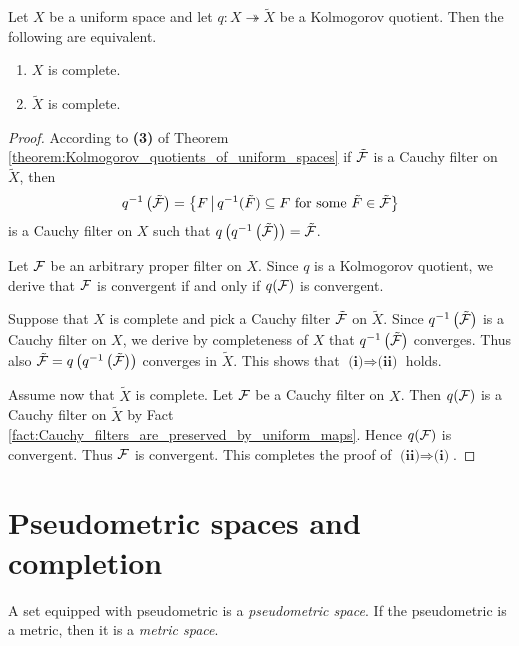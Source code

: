 \begin{theorem}\label{theorem:completeness_is_preserved_and_reflected_by_Kolmogorov_quotients}
	Let $X$ be a uniform space and let $q:X\twoheadrightarrow \tilde{X}$ be a Kolmogorov quotient. Then the following are equivalent.
	\begin{enumerate}[label=\emph{\textbf{(\roman*)}}, leftmargin=3.0em]
		\item $X$ is complete.
		\item $\tilde{X}$ is complete. 
	\end{enumerate}
\end{theorem}
\begin{proof}
	According to \textbf{(3)} of Theorem \ref{theorem:Kolmogorov_quotients_of_uniform_spaces} if $\tilde{{\mathcal F}}$ is a Cauchy filter on $\tilde{X}$, then 
	$$q^{-1}\left(\tilde{{\mathcal F}}\right) = \big\{F\,\big|\,q^{-1}(\tilde{F}) \subseteq F\mbox{ for some }\tilde{F}\in \tilde{{\mathcal F}}\big\}$$
	is a Cauchy filter on $X$ such that $q\left(q^{-1}\left(\tilde{{\mathcal F}}\right)\right) = \tilde{{\mathcal F}}$. 

	Let ${\mathcal F}$ be an arbitrary proper filter on $X$. Since $q$ is a Kolmogorov quotient, we derive that ${\mathcal F}$ is convergent if and only if $q({\mathcal F})$ is convergent.
	
	Suppose that $X$ is complete and pick a Cauchy filter $\tilde{{\mathcal F}}$ on $\tilde{X}$. Since $q^{-1}\left(\tilde{{\mathcal F}}\right)$ is a Cauchy filter on $X$, we derive by completeness of $X$ that $q^{-1}\left(\tilde{{\mathcal F}}\right)$ converges. Thus also $\tilde{{\mathcal F}} = q\left(q^{-1}\left(\tilde{{\mathcal F}}\right)\right)$ converges in $\tilde{X}$. This shows that $\textbf{(i)}\Rightarrow \textbf{(ii)}$ holds.

	Assume now that $\tilde{X}$ is complete. Let ${\mathcal F}$ be a Cauchy filter on $X$. Then $q({\mathcal F})$ is a Cauchy filter on $\tilde{X}$ by Fact \ref{fact:Cauchy_filters_are_preserved_by_uniform_maps}. Hence $q({\mathcal F})$ is convergent. Thus ${\mathcal F}$ is convergent. This completes the proof of $\textbf{(ii)}\Rightarrow \textbf{(i)}$.
\end{proof}

\section{Pseudometric spaces and completion}

\begin{definition}
	A set equipped with pseudometric is a \textit{pseudometric space}. If the pseudometric is a metric, then it is a \textit{metric space}.
\end{definition}

